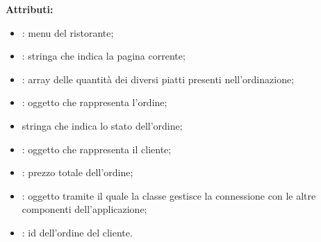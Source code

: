 \textbf{Attributi:}
\begin{itemize}
	\item {}: menu del ristorante;
	\item {}: stringa che indica la pagina corrente;
	\item {}: array delle quantità dei diversi piatti presenti nell'ordinazione;
	\item {}: oggetto che rappresenta l'ordine;
	\item {} stringa che indica lo stato dell'ordine;
	\item {}: oggetto che rappresenta il cliente;
	\item {}: prezzo totale dell'ordine;
	\item {}: oggetto tramite il quale la classe gestisce la connessione con le altre componenti dell'applicazione;
	\item {}: id dell'ordine del cliente.
\end{itemize}

